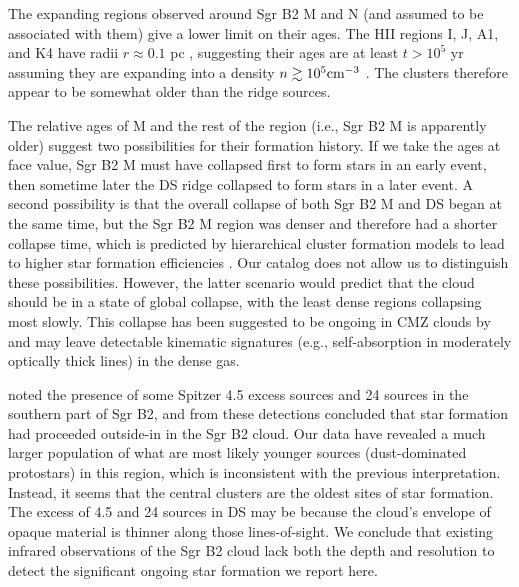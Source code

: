 \documentclass[twocolumn]{aastex61}
\begin{document}
The expanding \hii regions observed around Sgr B2 M and N (and assumed to be
associated with them) give a lower limit on their ages.  The HII regions I, J,
A1, and K4 have radii $r\approx0.1$ pc \citep{Gaume1995a}, suggesting their
ages are at least $t>10^5$ yr assuming they are expanding into 
a density $n\gtrsim10^5 \textrm{cm}^{-3}$ \citep{de-Pree1995a,Schmiedeke2016a}.
The clusters therefore appear to be somewhat older than the ridge sources.


The relative ages of M and the rest of the region (i.e., Sgr B2 M is apparently
older) suggest two possibilities for their formation history.  If we take the
ages at face value, Sgr B2 M must have collapsed first to form stars in an
early event, then sometime later the DS ridge collapsed to form stars in a
later event.  A second possibility is that the overall collapse of both Sgr B2
M and DS began at the same time, but the Sgr B2 M region was denser and
therefore had a shorter collapse time, which is predicted by hierarchical
cluster formation models to lead to higher star formation efficiencies
\citep{Kruijssen2012a}.  Our catalog does not allow us to distinguish these
possibilities.  However, the latter scenario would predict that the cloud
should be in a state of global collapse, with the least dense regions
collapsing most slowly.  This collapse has been suggested to be ongoing in CMZ
clouds by \citet{Walker2015a,Walker2016a} and may leave detectable kinematic
signatures (e.g., self-absorption in moderately optically thick lines) in the
dense gas.


\citet{Yusef-Zadeh2009a} noted the presence of some Spitzer 4.5 \um excess
sources and 24 \um sources in the southern part of Sgr B2, and from these
detections concluded that star formation had proceeded outside-in in the Sgr B2
cloud.  Our data have revealed a much larger population of what are most likely
younger sources (dust-dominated protostars) in this region, which is
inconsistent with the previous interpretation.  Instead, it seems that the
central clusters are the oldest sites of star formation.  The excess of 4.5 \um
and 24 \um sources in DS may be because the cloud's envelope of opaque material
is thinner along those lines-of-sight.  We conclude that existing infrared
observations of the Sgr B2 cloud lack both the depth and resolution to detect
the significant ongoing star formation we report here.
\end{document}

